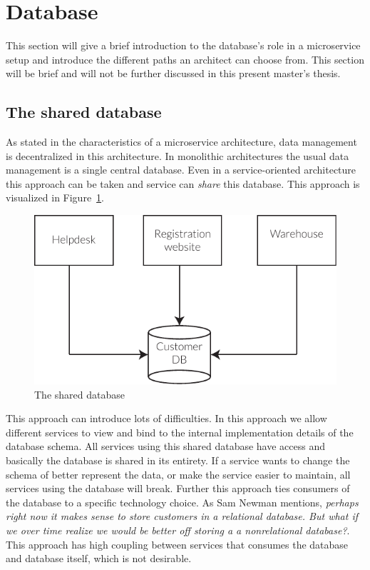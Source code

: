 \section{Database}
This section will give a brief introduction to the database's role in a microservice setup and introduce the different paths an architect can choose from. This section will be brief and will not be further discussed in this present master's thesis.

\subsection*{The shared database}
\noindent As stated in the characteristics of a microservice architecture, data management is decentralized in this architecture. In monolithic architectures the usual data management is a single central database. Even in a service-oriented architecture this approach can be taken and service can \textit{share} this database. This approach is visualized in Figure~\ref{fig:shared_database}.

\begin{figure}[H]
	\centering
	\includegraphics[scale=0.9]{figures/database_shared}
	\caption{The shared database}
	\label{fig:shared_database}
\end{figure}

\noindent This approach can introduce lots of difficulties. In this approach we allow different services to view and bind to the internal implementation details of the database schema. All services using this shared database have access and basically the database is shared in its entirety. If a service wants to change the schema of better represent the data, or make the service easier to maintain, all services using the database will break. Further this approach ties consumers of the database to a specific technology choice. As Sam Newman \cite[p. 41]{newman2015building} mentions, \textit{perhaps right now it makes sense to store customers in a relational database. But what if we over time realize we would be better off storing a a nonrelational database?}. This approach has high coupling between services that consumes the database and database itself, which is not desirable.

